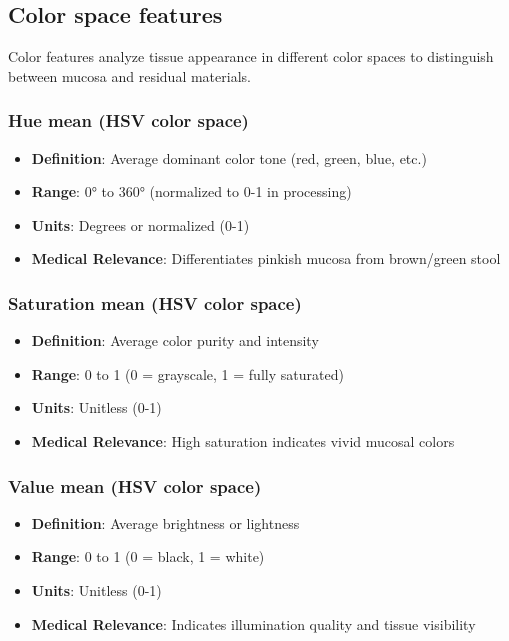 \documentclass[11pt]{article}
\begin{document}
\subsection{Color space features}

Color features analyze tissue appearance in different color spaces to distinguish between mucosa and residual materials.

\subsubsection{Hue mean (HSV color space)}
\begin{itemize}
    \item \textbf{Definition}: Average dominant color tone (red, green, blue, etc.)
    \item \textbf{Range}: 0° to 360° (normalized to 0-1 in processing)
    \item \textbf{Units}: Degrees or normalized (0-1)
    \item \textbf{Medical Relevance}: Differentiates pinkish mucosa from brown/green stool
\end{itemize}

\subsubsection{Saturation mean (HSV color space)}
\begin{itemize}
    \item \textbf{Definition}: Average color purity and intensity
    \item \textbf{Range}: 0 to 1 (0 = grayscale, 1 = fully saturated)
    \item \textbf{Units}: Unitless (0-1)
    \item \textbf{Medical Relevance}: High saturation indicates vivid mucosal colors
\end{itemize}

\subsubsection{Value mean (HSV color space)}
\begin{itemize}
    \item \textbf{Definition}: Average brightness or lightness
    \item \textbf{Range}: 0 to 1 (0 = black, 1 = white)
    \item \textbf{Units}: Unitless (0-1)
    \item \textbf{Medical Relevance}: Indicates illumination quality and tissue visibility
\end{itemize}
\end{document}
